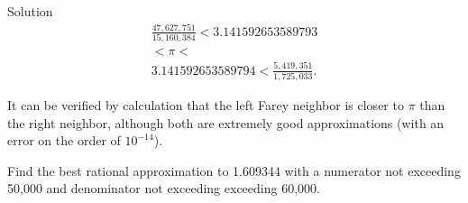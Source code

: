 \begin{vworkexampleparsection}{Solution}
\begin{eqnarray}
\nonumber{} & \displaystyle{\frac{47,\!627,\!751}{15,\!160,\!384}} < 3.141592653589793 & \\
            & < \pi < & \\
\nonumber{} & 3.141592653589794 < \displaystyle{\frac{5,\!419,\!351}{1,\!725,\!033}} .
\end{eqnarray}

It can be verified by calculation that the left Farey neighbor is
closer to $\pi$ than the right neighbor, although both are extremely good
approximations (with an error on the order of $10^{-14}$).
\end{vworkexampleparsection}

\begin{vworkexamplestatement}
\label{exmp:crla1:sxmp0:02}
Find the best rational approximation to 1.609344 with a numerator
not exceeding 50,000 and denominator not exceeding
exceeding 60,000.
\end{vworkexamplestatement}
